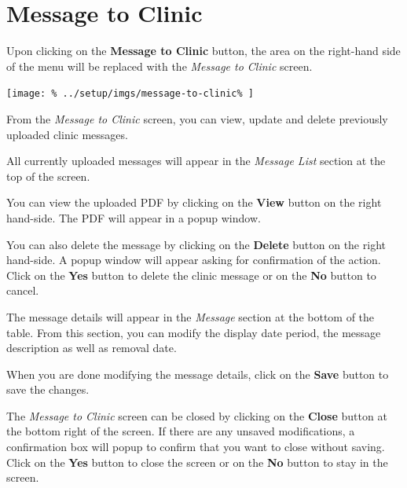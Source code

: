 \documentclass[../main/main]{subfiles}
\begin{document}
\newpage
\section{Message to Clinic}
\label{sec:message-to-clinic}

Upon clicking on the \textbf{Message to Clinic} button,
the area on the right-hand side of the menu will be replaced with the
\emph{Message to Clinic} screen.

\texttt{[image: \%
  ../setup/imgs/message-to-clinic\%
]}

From the \emph{Message to Clinic} screen, you can view, update and delete
previously uploaded clinic messages.

All currently uploaded messages will appear in the \emph{Message List} section
at the top of the screen.

You can view the uploaded PDF by clicking on the \textbf{View} button on the
right hand-side. The PDF will appear in a popup window.

You can also delete the message by clicking on the \textbf{Delete} button on
the right hand-side. A popup window will appear asking for confirmation of the
action. Click on the \textbf{Yes} button to delete the clinic message or on
the \textbf{No} button to cancel.

The message details will appear in the \emph{Message} section at the bottom
of the table. From this section, you can modify the display date period,
the message description as well as removal date.

When you are done modifying the message details, click on the \textbf{Save}
button to save the changes.

The \emph{Message to Clinic} screen can be closed by clicking on the
\textbf{Close} button at the bottom right of the screen. If there are any
unsaved modifications, a confirmation box will popup to confirm that you want
to close without saving. Click on the \textbf{Yes} button to close the screen
or on the \textbf{No} button to stay in the screen.
\end{document}
